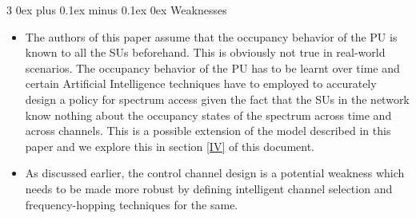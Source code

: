 \documentclass[12pt, draftcls, onecolumn]{IEEEtran}
\makeatletter
\def\subsubsection{\@startsection{subsubsection}%
                                 {3}%
                                 {\z@}%
                                 {0ex plus 0.1ex minus 0.1ex}%
                                 {0ex}%
                                 {\normalfont\normalsize\bfseries}}%
\makeatother
\begin{document}
\subsubsection{Weaknesses}
\begin{itemize}
    \item The authors of this paper assume that the occupancy behavior of the PU is known to all the SUs beforehand. This is obviously not true in real-world scenarios. The occupancy behavior of the PU has to be learnt over time and certain Artificial Intelligence techniques have to employed to accurately design a policy for spectrum access given the fact that the SUs in the network know nothing about the occupancy states of the spectrum across time and across channels. This is a possible extension of the model described in this paper and we explore this in section \ref{IV} of this document.
    \item As discussed earlier, the control channel design is a potential weakness which needs to be made more robust by defining intelligent channel selection and frequency-hopping techniques for the same.
\end{itemize}
\end{document}
